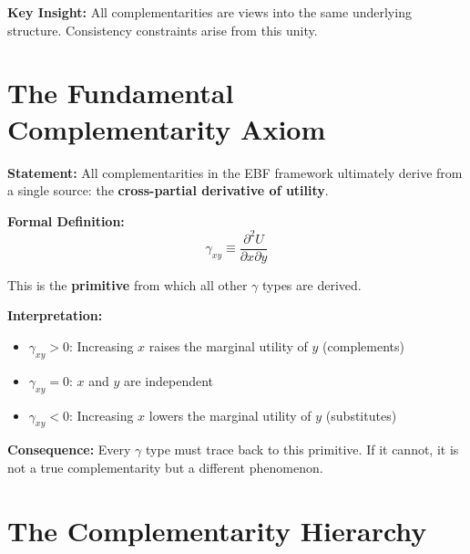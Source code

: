 \textbf{Key Insight:} All complementarities are views into the same underlying
structure. Consistency constraints arise from this unity.

\section{The Fundamental Complementarity Axiom}
\label{sec:gtc-axiom}

\begin{tcolorbox}[colback=blue!5!white, colframe=blue!75!black,
    title=Axiom GTC-1: The Source Axiom]

\textbf{Statement:} All complementarities in the EBF framework ultimately derive
from a single source: the \textbf{cross-partial derivative of utility}.

\textbf{Formal Definition:}
\begin{equation}
\boxed{
\gamma_{xy} \equiv \frac{\partial^2 U}{\partial x \partial y}
}
\end{equation}

This is the \textbf{primitive} from which all other $\gamma$ types are derived.

\textbf{Interpretation:}
\begin{itemize}[nosep]
    \item $\gamma_{xy} > 0$: Increasing $x$ raises the marginal utility of $y$ (complements)
    \item $\gamma_{xy} = 0$: $x$ and $y$ are independent
    \item $\gamma_{xy} < 0$: Increasing $x$ lowers the marginal utility of $y$ (substitutes)
\end{itemize}

\textbf{Consequence:} Every $\gamma$ type must trace back to this primitive.
If it cannot, it is not a true complementarity but a different phenomenon.

\end{tcolorbox}

\section{The Complementarity Hierarchy}
\label{sec:gtc-hierarchy}

